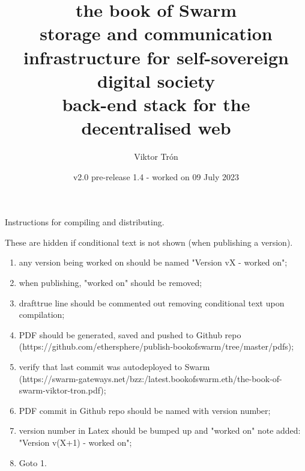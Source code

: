       
\makeglossaries
\title{\Huge\sc the book of Swarm\\
\Large storage and communication infrastructure for self-sovereign digital society\\
back-end stack for the decentralised web}
\author{Viktor Trón}
\date{v2.0 pre-release 1.4 - worked on 09 July 2023}
%

\frontmatter
\maketitle
\ifdraft
Instructions for compiling and distributing.

These are hidden if conditional text is not shown (when publishing a version).

\begin{enumerate}[noitemsep]
    \item any version being worked on should be named "Version vX - worked on";
    \item when publishing, "worked on" should be removed; 
    \item drafttrue line should be commented out removing conditional text upon compilation;
    \item PDF should be generated, saved and pushed to Github repo \\ (https://github.com/ethersphere/publish-bookofswarm/tree/master/pdfs); 
    \item verify that last commit was autodeployed to Swarm \\ (https://swarm-gateways.net/bzz:/latest.bookofswarm.eth/the-book-of-swarm-viktor-tron.pdf);
    \item PDF commit in Github repo should be named with version number;
    \item version number in Latex should be bumped up and "worked on" note added: "Version v(X+1) - worked on";
    \item Goto 1.
\end{enumerate}
\fi
%

\tableofcontents
\listoffigures

\label{sec:toc}
 
\mainmatter
